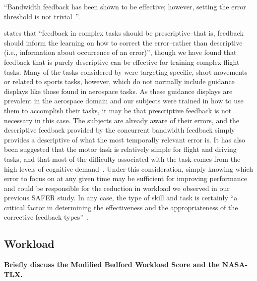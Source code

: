 ``Bandwidth feedback has been shown to be effective; however, setting the error threshold is not trivial~\citep{sigrist_augmented_2013, timmermans_technology-assisted_2009, RIBEIRO2011231}''.

\citeauthor{sigrist_augmented_2013} states that ``feedback in complex tasks should be prescriptive--that is, feedback should inform the learning on how to correct the error--rather than descriptive (i.e., information about occurrence of an error)'', though we have found that feedback that is purely descriptive can be effective for training complex flight tasks.
Many of the tasks considered by \citeauthor{sigrist_augmented_2013} were targeting specific, short movements or related to sports tasks, however, which do not normally include guidance displays like those found in aerospace tasks.
As these guidance displays are prevalent in the aerospace domain and our subjects were trained in how to use them to accomplish their tasks, it may be that prescriptive feedback is not necessary in this case.
The subjects are already aware of their errors, and the descriptive feedback provided by the concurrent bandwidth feedback simply provides a descriptive of what the most temporally relevant error is.
It has also been suggested that the motor task is relatively simple for flight and driving tasks, and that most of the difficulty associated with the task comes from the high levels of cognitive demand~\citep{doi:10.1080/00222899709600829}.
Under this consideration, simply knowing which error to focus on at any given time may be sufficient for improving performance and could be responsible for the reduction in workload we observed in our previous SAFER study.
In any case, the type of skill and task is certainly ``a critical factor in determining the effectiveness and the appropriateness of the corrective feedback types''~\citep{Tzetzis2008}.

\subsection{Workload}
\textbf{\color{red} Briefly discuss the Modified Bedford Workload Score and the NASA-TLX.}


